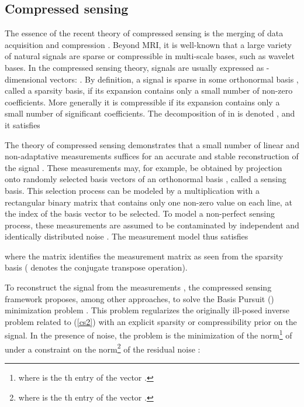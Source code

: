 \documentclass[10pt,draftcls, onecolumn]{IEEEtran}
\begin{document}
\subsection{Compressed sensing}
\label{sub:compressed sensing}

The essence of the recent theory of compressed sensing is the merging of data acquisition and compression \cite{candes06a, candes06b, candes06c, donoho06, candes07, baraniuk07a, rauhut10, donoho09}. Beyond MRI, it is well-known that a large variety of natural signals are sparse or compressible in multi-scale bases, such as wavelet bases. In the compressed sensing theory, signals are usually expressed as -dimensional vectors: . By definition, a signal is sparse in some orthonormal basis , called a sparsity basis, if its expansion contains only a small number  of non-zero coefficients. More generally it is compressible if its expansion contains only a small number of significant coefficients. The decomposition of  in  is denoted , and it satisfies



The theory of compressed sensing demonstrates that a small number  of linear and non-adaptative measurements  suffices for an accurate and stable reconstruction of the signal . These measurements may, for example, be obtained by projection onto  randomly selected basis vectors of an orthonormal basis , called a sensing basis. This selection process can be modeled by a multiplication with a rectangular binary matrix  that contains only one non-zero value on each line, at the index of the basis vector to be selected. To model a non-perfect sensing process, these measurements are assumed to be contaminated by independent and identically distributed noise . The measurement model thus satisfies

where the matrix  identifies the measurement matrix as seen from the sparsity basis ( denotes the conjugate transpose operation).

To reconstruct the signal  from the measurements , the compressed sensing framework proposes, among other approaches, to solve the Basis Pursuit () minimization problem \cite{candes06a, candes06b, candes06c, donoho06, candes07, baraniuk07a, donoho09, rauhut10}. This problem regularizes the originally ill-posed inverse problem related to (\ref{cs2}) with an explicit sparsity or compressibility prior on the signal. In the presence of noise, the  problem is the minimization of the  norm\footnote{ where  is the th entry of the vector .} of  under a constraint on the  norm\footnote{ where  is the th entry of the vector .} of the residual noise :
\end{document}
